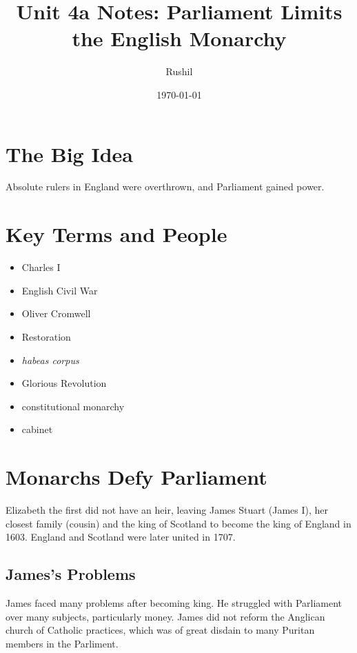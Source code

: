 \documentclass[11pt]{article}
\author{Rushil}
\date{\today}
\title{Unit 4a Notes: Parliament Limits the English Monarchy}
\begin{document}
\maketitle
\newpage
\section{The Big Idea}
\label{sec:orgdd33ab5}
Absolute rulers in England were overthrown, and Parliament gained power.
\section{Key Terms and People}
\label{sec:orgbcf2b77}
\begin{itemize}
\item Charles I
\item English Civil War
\item Oliver Cromwell
\item Restoration
\item \emph{habeas corpus}
\item Glorious Revolution
\item constitutional monarchy
\item cabinet
\end{itemize}
\section{Monarchs Defy Parliament}
\label{sec:orgd1cf93e}
Elizabeth the first did not have an heir, leaving James Stuart (James I), her closest family (cousin) and the king of Scotland to become the king of England in 1603. England and Scotland were later united in 1707.
\subsection{James's Problems}
\label{sec:org40cca38}
James faced many problems after becoming king. He struggled with Parliament over many subjects, particularly money. James did not reform the Anglican church of Catholic practices, which was of great disdain to many Puritan members in the Parliment.
\end{document}
